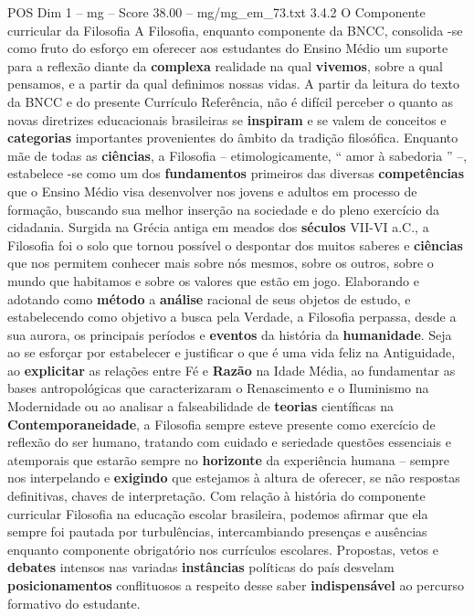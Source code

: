 \begin{textsample}{POS Dim 1 – mg – Score 38.00 – mg/mg\_em\_73.txt}  \label{ex:f1_pos_239}
3.4.2 O Componente curricular da Filosofia A Filosofia, enquanto componente da BNCC, consolida -se como fruto do esforço em oferecer aos estudantes do Ensino Médio um suporte para a reflexão diante da \textbf{complexa} realidade na qual \textbf{vivemos}, sobre a qual pensamos, e a partir da qual definimos nossas vidas.
A partir da leitura do texto da BNCC e do presente Currículo Referência, não é difícil perceber o quanto as novas diretrizes educacionais brasileiras se \textbf{inspiram} e se valem de conceitos e \textbf{categorias} importantes provenientes do âmbito da tradição filosófica.
Enquanto mãe de todas as \textbf{ciências}, a Filosofia – etimologicamente, “ amor à sabedoria ” –, estabelece -se como um dos \textbf{fundamentos} primeiros das diversas \textbf{competências} que o Ensino Médio visa desenvolver nos jovens e adultos em processo de formação, buscando sua melhor inserção na sociedade e do pleno exercício da cidadania.
Surgida na Grécia antiga em meados dos \textbf{séculos} VII-VI a.C., a Filosofia foi o solo que tornou possível o despontar dos muitos saberes e \textbf{ciências} que nos permitem conhecer mais sobre nós mesmos, sobre os outros, sobre o mundo que habitamos e sobre os valores que estão em jogo.
Elaborando e adotando como \textbf{método} a \textbf{análise} racional de seus objetos de estudo, e estabelecendo como objetivo a busca pela Verdade, a Filosofia perpassa, desde a sua aurora, os principais períodos e \textbf{eventos} da história da \textbf{humanidade}.
Seja ao se esforçar por estabelecer e justificar o que é uma vida feliz na Antiguidade, ao \textbf{explicitar} as relações entre Fé e \textbf{Razão} na Idade Média, ao fundamentar as bases antropológicas que caracterizaram o Renascimento e o Iluminismo na Modernidade ou ao analisar a falseabilidade de \textbf{teorias} científicas na \textbf{Contemporaneidade}, a Filosofia sempre esteve presente como exercício de reflexão do ser humano, tratando com cuidado e seriedade questões essenciais e atemporais que estarão sempre no \textbf{horizonte} da experiência humana – sempre nos interpelando e \textbf{exigindo} que estejamos à altura de oferecer, se não respostas definitivas, chaves de interpretação.
Com relação à história do componente curricular Filosofia na educação escolar brasileira, podemos afirmar que ela sempre foi pautada por turbulências, intercambiando presenças e ausências enquanto componente obrigatório nos currículos escolares.
Propostas, vetos e \textbf{debates} intensos nas variadas \textbf{instâncias} políticas do país desvelam \textbf{posicionamentos} conflituosos a respeito desse saber \textbf{indispensável} ao percurso formativo do estudante.

\end{textsample}
